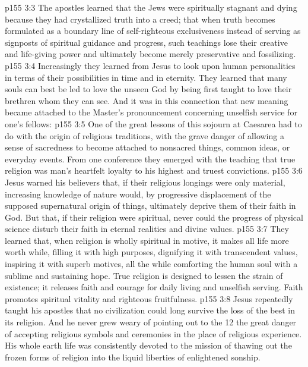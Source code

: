 \vs p155 3:3 The apostles learned that the Jews were spiritually stagnant and dying because they had crystallized truth into a creed; that when truth becomes formulated as a boundary line of self\hyp{}righteous exclusiveness instead of serving as signposts of spiritual guidance and progress, such teachings lose their creative and life\hyp{}giving power and ultimately become merely preservative and fossilizing.
\vs p155 3:4 Increasingly they learned from Jesus to look upon human personalities in terms of their possibilities in time and in eternity. They learned that many souls can best be led to love the unseen God by being first taught to love their brethren whom they can see. And it was in this connection that new meaning became attached to the Master’s pronouncement concerning unselfish service for one’s fellows: 
\vs p155 3:5 One of the great lessons of this sojourn at Caesarea had to do with the origin of religious traditions, with the grave danger of allowing a sense of sacredness to become attached to nonsacred things, common ideas, or everyday events. From one conference they emerged with the teaching that true religion was man’s heartfelt loyalty to his highest and truest convictions.
\vs p155 3:6 Jesus warned his believers that, if their religious longings were only material, increasing knowledge of nature would, by progressive displacement of the supposed supernatural origin of things, ultimately deprive them of their faith in God. But that, if their religion were spiritual, never could the progress of physical science disturb their faith in eternal realities and divine values.
\vs p155 3:7 They learned that, when religion is wholly spiritual in motive, it makes all life more worth while, filling it with high purposes, dignifying it with transcendent values, inspiring it with superb motives, all the while comforting the human soul with a sublime and sustaining hope. True religion is designed to lessen the strain of existence; it releases faith and courage for daily living and unselfish serving. Faith promotes spiritual vitality and righteous fruitfulness.
\vs p155 3:8 Jesus repeatedly taught his apostles that no civilization could long survive the loss of the best in its religion. And he never grew weary of pointing out to the 12 the great danger of accepting religious symbols and ceremonies in the place of religious experience. His whole earth life was consistently devoted to the mission of thawing out the frozen forms of religion into the liquid liberties of enlightened sonship.
